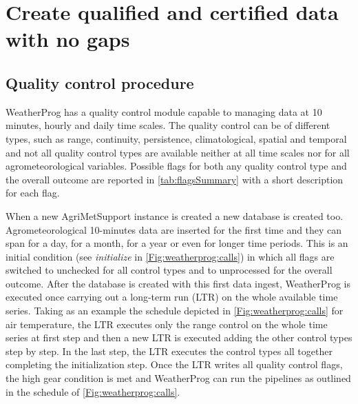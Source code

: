 \documentclass[authoryear,preprint,review,12pt]{elsarticle}
\newcommand{\note}[1]{\emph{\textcolor{red}{#1}}}
\begin{document}
\section{Create qualified and certified data with no gaps}

\subsection{Quality control procedure} \label{sec:qcheck}
WeatherProg has a quality control module capable to managing data at 10 minutes, hourly and daily time scales.
The quality control can be of different types, such as range, continuity, persistence, climatological, spatial and temporal and not all quality control types are available neither at all time scales nor for all agrometeorological variables.
Possible flags for both any quality control type and the overall outcome are reported in \cref{tab:flagsSummary} with a short description for each flag.

When a new AgriMetSupport instance is created a new database is created too.
Agrometeorological 10-minutes data are inserted for the first time and they can span for a day, for a month, for a year or even for longer time periods.
This is an initial condition (see \textit{initialize} in \cref{Fig:weatherprog:calls}) in which all flags are switched to unchecked for all control types and to unprocessed for the overall outcome.
After the database is created with this first data ingest, WeatherProg is executed once carrying out a long-term run (LTR) on the whole available time series.
Taking as an example the schedule depicted in \cref{Fig:weatherprog:calls} for air temperature, the LTR executes only the range control on the whole time series at first step and then a new LTR is executed adding the other control types step by step.
In the last step, the LTR executes the control types all together completing the initialization step.
Once the LTR writes all quality control flags, the high gear condition is met and WeatherProg can run the pipelines as outlined in the schedule of \cref{Fig:weatherprog:calls}.
\end{document}
